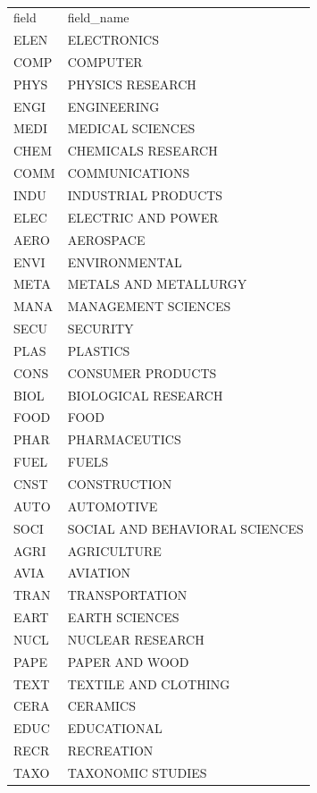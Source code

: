 \documentclass[12pt,letterpaper]{article}
\begin{document}
\begin{table}[H]
\scriptsize
\centering
\begin{tabular}{ll}
field & field\_name                    \\
ELEN  & ELECTRONICS                    \\
COMP  & COMPUTER                       \\
PHYS  & PHYSICS RESEARCH               \\
ENGI  & ENGINEERING                    \\
MEDI  & MEDICAL SCIENCES               \\
CHEM  & CHEMICALS RESEARCH             \\
COMM  & COMMUNICATIONS                 \\
INDU  & INDUSTRIAL PRODUCTS            \\
ELEC  & ELECTRIC AND POWER             \\
AERO  & AEROSPACE                      \\
ENVI  & ENVIRONMENTAL                  \\
META  & METALS AND METALLURGY          \\
MANA  & MANAGEMENT SCIENCES            \\
SECU  & SECURITY                       \\
PLAS  & PLASTICS                       \\
CONS  & CONSUMER PRODUCTS              \\
BIOL  & BIOLOGICAL RESEARCH            \\
FOOD  & FOOD                           \\
PHAR  & PHARMACEUTICS                  \\
FUEL  & FUELS                          \\
CNST  & CONSTRUCTION                   \\
AUTO  & AUTOMOTIVE                     \\
SOCI  & SOCIAL AND BEHAVIORAL SCIENCES \\
AGRI  & AGRICULTURE                    \\
AVIA  & AVIATION                       \\
TRAN  & TRANSPORTATION                 \\
EART  & EARTH SCIENCES                 \\
NUCL  & NUCLEAR RESEARCH               \\
PAPE  & PAPER AND WOOD                 \\
TEXT  & TEXTILE AND CLOTHING           \\
CERA  & CERAMICS                       \\
EDUC  & EDUCATIONAL                    \\
RECR  & RECREATION                     \\
TAXO  & TAXONOMIC STUDIES             
\end{tabular}
\caption{}
\label{tab:11}
\end{table}
\end{document}
